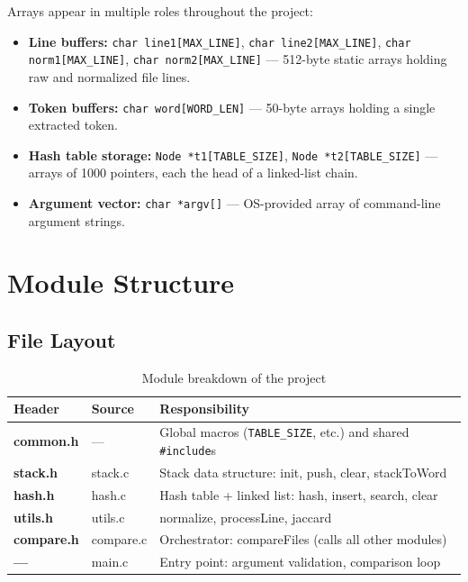 \documentclass[12pt,a4paper]{article}
\begin{document}
Arrays appear in multiple roles throughout the project:

\begin{itemize}[leftmargin=1.5cm, itemsep=4pt]
  \item \textbf{Line buffers:} \texttt{char line1[MAX\_LINE]}, \texttt{char line2[MAX\_LINE]}, \texttt{char norm1[MAX\_LINE]}, \texttt{char norm2[MAX\_LINE]} — 512-byte static arrays holding raw and normalized file lines.
  \item \textbf{Token buffers:} \texttt{char word[WORD\_LEN]} — 50-byte arrays holding a single extracted token.
  \item \textbf{Hash table storage:} \texttt{Node *t1[TABLE\_SIZE]}, \texttt{Node *t2[TABLE\_SIZE]} — arrays of 1000 pointers, each the head of a linked-list chain.
  \item \textbf{Argument vector:} \texttt{char *argv[]} — OS-provided array of command-line argument strings.
\end{itemize}

\newpage


\section{Module Structure}

\subsection{File Layout}

\begin{table}[H]
\centering\renewcommand{\arraystretch}{1.5}
\begin{tabularx}{0.96\textwidth}{>{\bfseries\ttfamily}l >{\ttfamily}l X}
\toprule
Header & Source & Responsibility \\\midrule
common.h   & —         & Global macros (\texttt{TABLE\_SIZE}, etc.) and shared \texttt{\#include}s \\
stack.h    & stack.c   & Stack data structure: init, push, clear, stackToWord \\
hash.h     & hash.c    & Hash table + linked list: hash, insert, search, clear \\
utils.h    & utils.c   & normalize, processLine, jaccard \\
compare.h  & compare.c & Orchestrator: compareFiles (calls all other modules) \\
—          & main.c    & Entry point: argument validation, comparison loop \\
\bottomrule
\end{tabularx}
\caption{Module breakdown of the project}
\end{table}
\end{document}
